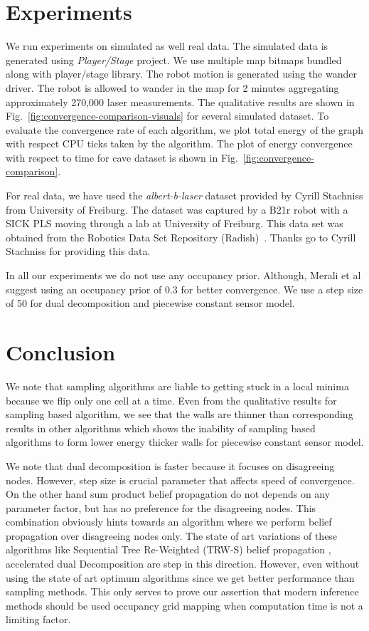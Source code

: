 \documentclass[letterpaper, 10 pt, conference]{ieeeconf} %
\begin{document}
\section{Experiments} 
We run experiments on simulated as well real data.
The simulated data is generated using \emph{Player/Stage} \cite{gerkey2003player}
project. We use multiple map bitmaps bundled along with player/stage library.
The robot motion is generated using the wander driver. The robot is allowed to
wander in the map for 2 minutes aggregating approximately 270,000 laser measurements.
The qualitative results are shown in
Fig.~\ref{fig:convergence-comparison-visuals} for several simulated dataset. To
evaluate the convergence rate of each algorithm, we plot total energy of the
graph with respect CPU ticks taken by the algorithm. The plot of energy
convergence with respect to time for cave dataset is shown in
Fig.~\ref{fig:convergence-comparison}.

For real data, we have used the \emph{albert-b-laser} dataset provided by
Cyrill Stachniss from University of Freiburg. The dataset was captured by a
B21r robot with a SICK PLS moving through a lab at University of Freiburg.
This data set was obtained from the Robotics Data Set Repository
(Radish)~\cite{howard2003radish}. Thanks go to Cyrill Stachniss for providing
this data.

In all our experiments we do not use any occupancy prior. Although, Merali et
al \cite{merali2013icra} suggest using an occupancy prior of 0.3 for better
convergence. We use a step size of 50 for dual decomposition and piecewise constant 
sensor model.

\section{Conclusion}
We note that sampling algorithms are liable to getting stuck in a local minima
because we flip only one cell at a time. Even from the qualitative results for
sampling based algorithm, we see that the walls are thinner than corresponding
results in other algorithms which shows the inability of sampling based
algorithms to form lower energy thicker walls for piecewise constant sensor
model.

We note that dual decomposition is faster because it focuses on disagreeing
nodes. However, step size is crucial parameter that affects speed of
convergence. On the other hand sum product belief propagation do not depends
on any parameter factor, but has no preference for the disagreeing nodes.
This combination obviously hints towards an algorithm where we perform 
belief propagation over disagreeing nodes only. The state of art variations 
of these algorithms like Sequential Tree Re-Weighted (TRW-S) belief
propagation \cite{kolmogorov2006convergent}, accelerated dual Decomposition
\cite{jojic2010accelerated} are step in this direction.
However, even without using the state of art optimum algorithms since we get
better performance than sampling methods. This only serves to prove our
assertion that modern inference methods should be used occupancy grid mapping 
when computation time is not a limiting factor.
\end{document}
